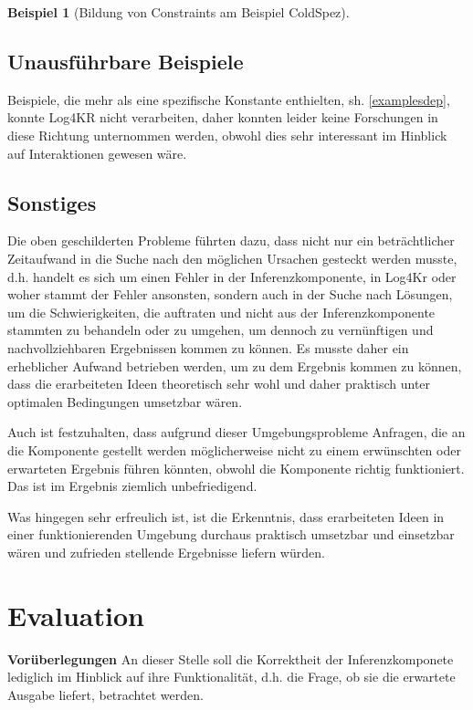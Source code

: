 \documentclass[draft]{scrreprt}
\newtheorem{Bsp}{Beispiel}[section]
\begin{document}
{\begin{Bsp}[Bildung von Constraints am Beispiel ColdSpez]
\end{Bsp}



\section{Unausführbare Beispiele} \label{Beispiele unausfuehrbar} 
Beispiele, die mehr als eine spezifische Konstante enthielten, sh. \ref{examplesdep}, konnte Log4KR nicht verarbeiten, daher konnten leider keine Forschungen in diese Richtung unternommen werden, obwohl dies sehr interessant im Hinblick auf Interaktionen gewesen wäre. 

\section{Sonstiges}
Die oben geschilderten Probleme führten dazu, dass nicht nur ein beträchtlicher Zeitaufwand in die Suche nach den möglichen Ursachen gesteckt werden musste, d.h. handelt es sich um einen Fehler in der Inferenzkomponente, in Log4Kr oder woher stammt der Fehler ansonsten, sondern auch in der Suche nach Lösungen, um die Schwierigkeiten, die auftraten und nicht aus der Inferenzkomponente stammten zu behandeln oder zu umgehen, um dennoch zu vernünftigen und nachvollziehbaren Ergebnissen kommen zu können. 
Es musste daher ein erheblicher Aufwand betrieben werden, um zu dem Ergebnis kommen zu können, dass die erarbeiteten Ideen theoretisch sehr wohl und daher praktisch unter optimalen Bedingungen umsetzbar wären.

Auch ist festzuhalten, dass aufgrund dieser Umgebungsprobleme Anfragen, die an die Komponente gestellt werden möglicherweise nicht zu einem erwünschten oder erwarteten Ergebnis führen könnten, obwohl die Komponente richtig funktioniert. Das ist im Ergebnis ziemlich unbefriedigend. 

Was hingegen sehr erfreulich ist, ist die Erkenntnis, dass erarbeiteten Ideen in einer funktionierenden Umgebung durchaus praktisch umsetzbar und einsetzbar wären und zufrieden stellende Ergebnisse liefern würden.


\chapter{Evaluation}\label{eval} 
\textbf{Vorüberlegungen}
An dieser Stelle soll die Korrektheit der Inferenzkomponete lediglich im Hinblick auf ihre Funktionalität, d.h. die Frage, ob sie die erwartete Ausgabe liefert, betrachtet werden. 

}
\end{document}
